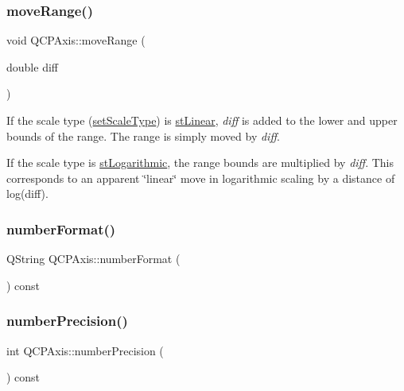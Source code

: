 \mbox{\label{class_q_c_p_axis_a18f3a68f2b691af1fd34b6593c886630}} 
\subsubsection{\texorpdfstring{moveRange()}{moveRange()}}
{\footnotesize\ttfamily void Q\+C\+P\+Axis\+::move\+Range (\begin{DoxyParamCaption}\item[{double}]{diff }\end{DoxyParamCaption})}

If the scale type (\mbox{\hyperlink{class_q_c_p_axis_adef29cae617af4f519f6c40d1a866ca6}{set\+Scale\+Type}}) is \mbox{\hyperlink{class_q_c_p_axis_a36d8e8658dbaa179bf2aeb973db2d6f0aff6e30a11a828bc850caffab0ff994f6}{st\+Linear}}, {\itshape diff} is added to the lower and upper bounds of the range. The range is simply moved by {\itshape diff}.

If the scale type is \mbox{\hyperlink{class_q_c_p_axis_a36d8e8658dbaa179bf2aeb973db2d6f0abf5b785ad976618816dc6f79b73216d4}{st\+Logarithmic}}, the range bounds are multiplied by {\itshape diff}. This corresponds to an apparent \char`\"{}linear\char`\"{} move in logarithmic scaling by a distance of log(diff). \mbox{\label{class_q_c_p_axis_a20cc29c2f282a0e9efd8f32145e47be6}} 
\subsubsection{\texorpdfstring{numberFormat()}{numberFormat()}}
{\footnotesize\ttfamily Q\+String Q\+C\+P\+Axis\+::number\+Format (\begin{DoxyParamCaption}{ }\end{DoxyParamCaption}) const}

\mbox{\label{class_q_c_p_axis_a2562b6f3a4a01c7ed83a388042664998}} 
\subsubsection{\texorpdfstring{numberPrecision()}{numberPrecision()}}
{\footnotesize\ttfamily int Q\+C\+P\+Axis\+::number\+Precision (\begin{DoxyParamCaption}{ }\end{DoxyParamCaption}) const\hspace{0.3cm}{\ttfamily [inline]}}

